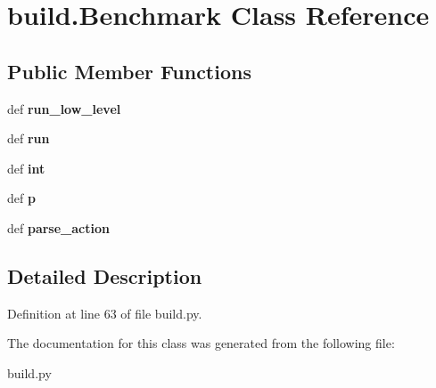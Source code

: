 \hypertarget{classbuild_1_1Benchmark}{\section{build.\-Benchmark \-Class \-Reference}
\label{classbuild_1_1Benchmark}
}
\subsection*{\-Public \-Member \-Functions}
\begin{DoxyCompactItemize}
\item 
\hypertarget{classbuild_1_1Benchmark_aa83f3c52517967b7aaeb6ea896f03feb}{def {\bfseries run\-\_\-low\-\_\-level}}\label{classbuild_1_1Benchmark_aa83f3c52517967b7aaeb6ea896f03feb}

\item 
\hypertarget{classbuild_1_1Benchmark_aaa6c3e07a5f9853f9efa2b8057a1346d}{def {\bfseries run}}\label{classbuild_1_1Benchmark_aaa6c3e07a5f9853f9efa2b8057a1346d}

\item 
\hypertarget{classbuild_1_1Benchmark_a519134bd27acbd705050c16f593bfa82}{def {\bfseries int}}\label{classbuild_1_1Benchmark_a519134bd27acbd705050c16f593bfa82}

\item 
\hypertarget{classbuild_1_1Benchmark_a184359333daaa47e8d2dd22d8065b233}{def {\bfseries p}}\label{classbuild_1_1Benchmark_a184359333daaa47e8d2dd22d8065b233}

\item 
\hypertarget{classbuild_1_1Benchmark_a5b7c8ca2109cdd060640d95f7dab7209}{def {\bfseries parse\-\_\-action}}\label{classbuild_1_1Benchmark_a5b7c8ca2109cdd060640d95f7dab7209}

\end{DoxyCompactItemize}


\subsection{\-Detailed \-Description}


\-Definition at line 63 of file build.\-py.



\-The documentation for this class was generated from the following file\-:\begin{DoxyCompactItemize}
\item 
build.\-py\end{DoxyCompactItemize}
